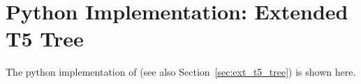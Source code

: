 \chapter{Python Implementation: Extended T5 Tree}
\label{cha:appendix_t5_tree_implementation}
The python implementation of \textit{\extree} (see also Section~\ref{sec:ext_t5_tree}) is shown here.

% 

\inputminted[breaklines,linenos]{python}{scripts/T5Tree.py}